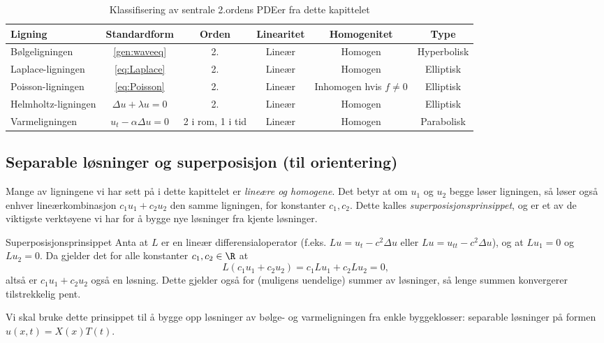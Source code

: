 \begin{table}[ht]
\centering
\footnotesize
\setlength{\tabcolsep}{2pt}
\begin{tabular}{|l|c|c|c|c|c|}
\hline
\textbf{Ligning} & \textbf{Standardform} & \textbf{Orden} & \textbf{Linearitet} & \textbf{Homogenitet} & \textbf{Type} \\
\hline
Bølgeligningen & \eqref{gen:waveeq} & 2. & Lineær & Homogen & Hyperbolisk \\
\hline
Laplace-ligningen & \eqref{eq:Laplace} & 2. & Lineær & Homogen & Elliptisk \\
\hline
Poisson-ligningen & \eqref{eq:Poisson} & 2. & Lineær & Inhomogen hvis $f\neq0$ & Elliptisk \\
\hline
Helmholtz-ligningen & $\Delta u + \lambda u = 0$ & 2. & Lineær & Homogen & Elliptisk \\
\hline
Varmeligningen & $u_t - \alpha \Delta u = 0$ & 2 i rom, 1 i tid & Lineær & Homogen & Parabolisk \\
\hline
\end{tabular}
\caption{Klassifisering av sentrale 2.ordens PDEer fra dette kapittelet}
\label{tab:klass_pde_eksempler}
\end{table}

\subsection{Separable løsninger og superposisjon (til orientering)}\label{sect:separable}

Mange av ligningene vi har sett på i dette kapittelet er \emph{lineære og homogene}. Det betyr at om $u_1$ og $u_2$ begge løser ligningen, så løser også enhver lineærkombinasjon $c_1u_1+c_2u_2$ den samme ligningen, for konstanter $c_1,c_2$. Dette kalles \emph{superposisjonsprinsippet}, og er et av de viktigste verktøyene vi har for å bygge nye løsninger fra kjente løsninger.

\begin{oppsum}{Superposisjonsprinsippet}
Anta at $L$ er en lineær differensialoperator (f.eks. $Lu = u_t - c^2\Delta u$ eller $Lu = u_{tt}-c^2\Delta u$), og at $Lu_1=0$ og $Lu_2=0$. Da gjelder det for alle konstanter $c_1,c_2\in\R$ at
\[
L(c_1u_1+c_2u_2) = c_1 Lu_1 + c_2 Lu_2 = 0,
\]
altså er $c_1u_1+c_2u_2$ også en løsning. Dette gjelder også for (muligens uendelige) summer av løsninger, så lenge summen konvergerer tilstrekkelig pent.
\end{oppsum}

Vi skal bruke dette prinsippet til å bygge opp løsninger av bølge- og varmeligningen fra enkle byggeklosser: separable løsninger på formen $u(x,t)=X(x)T(t)$.

